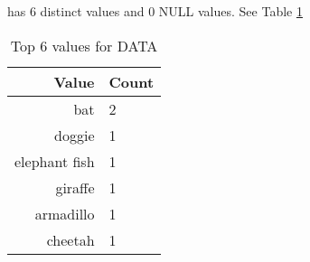 \item[DATA] has 6 distinct values and 0 NULL values.
See Table \ref{tab:DATA}
\begin{table}
\caption{Top 6 values for DATA} \label{tab:DATA}
\centering
\begin{tabular}{|r|l|}
\hline
Value & Count \\
\hline
bat & 2 \\
doggie & 1 \\
elephant fish & 1 \\
giraffe & 1 \\
armadillo & 1 \\
cheetah & 1 \\
\hline
\end{tabular}
\end{table}
